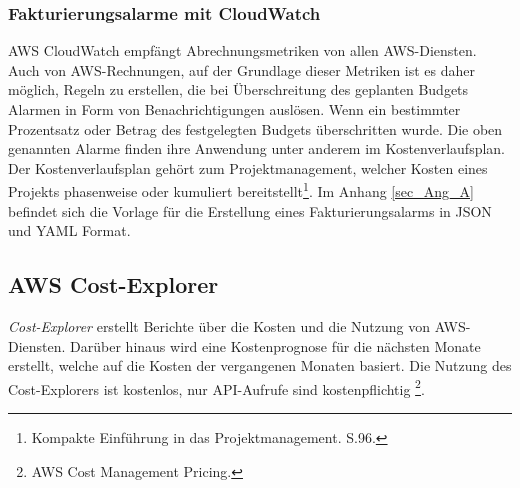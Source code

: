 \subsubsection*{Fakturierungsalarme mit CloudWatch}
AWS CloudWatch empfängt Abrechnungsmetriken von allen AWS-Diensten. Auch von AWS-Rechnungen, auf der Grundlage dieser Metriken ist es daher möglich, Regeln zu erstellen, die bei Überschreitung des geplanten Budgets Alarmen in Form von Benachrichtigungen auslösen.
Wenn ein bestimmter Prozentsatz oder Betrag des festgelegten Budgets überschritten wurde. Die oben genannten Alarme finden ihre Anwendung unter anderem im Kostenverlaufsplan. Der Kostenverlaufsplan gehört zum Projektmanagement, welcher Kosten eines Projekts phasenweise oder kumuliert bereitstellt\footnote{Kompakte Einführung in das Projektmanagement. S.96\cite{PM1}.}. Im Anhang \ref{sec_Ang_A} befindet sich die Vorlage für die Erstellung eines Fakturierungsalarms in JSON und YAML Format.
\subsection{AWS Cost-Explorer}\label{ssec:Cost-Explorer}
\textit{Cost-Explorer} erstellt Berichte über die Kosten und die Nutzung von AWS-Diensten. Darüber hinaus wird eine Kostenprognose für die nächsten Monate erstellt, welche auf die Kosten der vergangenen Monaten basiert. Die Nutzung des Cost-Explorers ist kostenlos, nur API-Aufrufe sind kostenpflichtig \footnote{{AWS Cost Management Pricing\cite{AMZ22}.}}.
